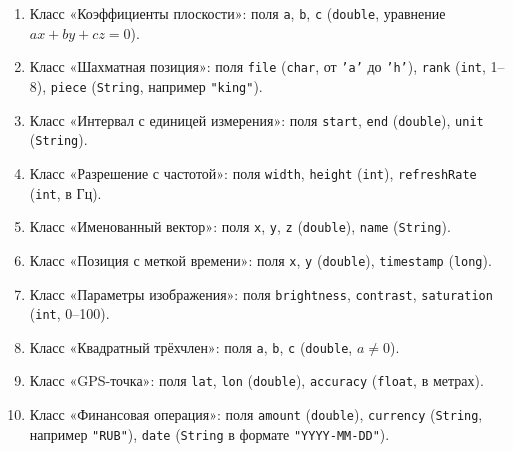 \documentclass[12pt]{article}
\begin{document}
\begin{enumerate}
    \item Класс «Коэффициенты плоскости»: поля \texttt{a}, \texttt{b}, \texttt{c} (\texttt{double}, уравнение $ax + by + cz = 0$).
    \item Класс «Шахматная позиция»: поля \texttt{file} (\texttt{char}, от \texttt{'a'} до \texttt{'h'}), \texttt{rank} (\texttt{int}, 1–8), \texttt{piece} (\texttt{String}, например \texttt{"king"}).
    \item Класс «Интервал с единицей измерения»: поля \texttt{start}, \texttt{end} (\texttt{double}), \texttt{unit} (\texttt{String}).
    \item Класс «Разрешение с частотой»: поля \texttt{width}, \texttt{height} (\texttt{int}), \texttt{refreshRate} (\texttt{int}, в Гц).
    \item Класс «Именованный вектор»: поля \texttt{x}, \texttt{y}, \texttt{z} (\texttt{double}), \texttt{name} (\texttt{String}).
    \item Класс «Позиция с меткой времени»: поля \texttt{x}, \texttt{y} (\texttt{double}), \texttt{timestamp} (\texttt{long}).
    \item Класс «Параметры изображения»: поля \texttt{brightness}, \texttt{contrast}, \texttt{saturation} (\texttt{int}, 0–100).
    \item Класс «Квадратный трёхчлен»: поля \texttt{a}, \texttt{b}, \texttt{c} (\texttt{double}, $a \neq 0$).
    \item Класс «GPS-точка»: поля \texttt{lat}, \texttt{lon} (\texttt{double}), \texttt{accuracy} (\texttt{float}, в метрах).
    \item Класс «Финансовая операция»: поля \texttt{amount} (\texttt{double}), \texttt{currency} (\texttt{String}, например \texttt{"RUB"}), \texttt{date} (\texttt{String} в формате \texttt{"YYYY-MM-DD"}).
\end{enumerate}
\end{document}
